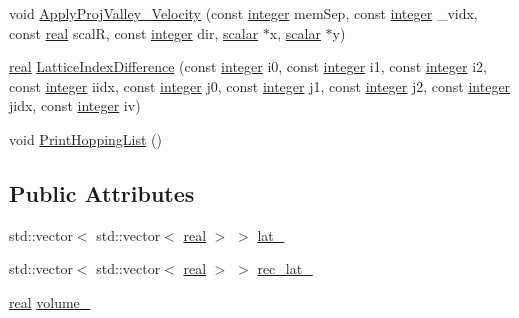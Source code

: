 \begin{DoxyCompactItemize}
void \hyperlink{classNumCal_1_1Lattice_aad6fc09875728b3dab9784b550e1cd53}{Apply\+Proj\+Valley\+\_\+\+Velocity} (const \hyperlink{namespaceNumCal_ae1031b42812e871d8f5bd9b7b15fc7d8}{integer} mem\+Sep, const \hyperlink{namespaceNumCal_ae1031b42812e871d8f5bd9b7b15fc7d8}{integer} \+\_\+vidx, const \hyperlink{namespaceNumCal_ac10564761316cff6fb75fe8bfccd6def}{real} scal\+R, const \hyperlink{namespaceNumCal_ae1031b42812e871d8f5bd9b7b15fc7d8}{integer} dir, \hyperlink{namespaceNumCal_a45f8f32ea0c2b926caa1ad763bd77c96}{scalar} $\ast$x, \hyperlink{namespaceNumCal_a45f8f32ea0c2b926caa1ad763bd77c96}{scalar} $\ast$y)
\item 
\hyperlink{namespaceNumCal_ac10564761316cff6fb75fe8bfccd6def}{real} \hyperlink{classNumCal_1_1Lattice_a02548b1f44c555055434abadfbc8ae24}{Lattice\+Index\+Difference} (const \hyperlink{namespaceNumCal_ae1031b42812e871d8f5bd9b7b15fc7d8}{integer} i0, const \hyperlink{namespaceNumCal_ae1031b42812e871d8f5bd9b7b15fc7d8}{integer} i1, const \hyperlink{namespaceNumCal_ae1031b42812e871d8f5bd9b7b15fc7d8}{integer} i2, const \hyperlink{namespaceNumCal_ae1031b42812e871d8f5bd9b7b15fc7d8}{integer} iidx, const \hyperlink{namespaceNumCal_ae1031b42812e871d8f5bd9b7b15fc7d8}{integer} j0, const \hyperlink{namespaceNumCal_ae1031b42812e871d8f5bd9b7b15fc7d8}{integer} j1, const \hyperlink{namespaceNumCal_ae1031b42812e871d8f5bd9b7b15fc7d8}{integer} j2, const \hyperlink{namespaceNumCal_ae1031b42812e871d8f5bd9b7b15fc7d8}{integer} jidx, const \hyperlink{namespaceNumCal_ae1031b42812e871d8f5bd9b7b15fc7d8}{integer} iv)
\item 
void \hyperlink{classNumCal_1_1Lattice_a37ce0f5bd308163d2fb1d4f905c039e0}{Print\+Hopping\+List} ()
\end{DoxyCompactItemize}
\subsection*{Public Attributes}
\begin{DoxyCompactItemize}
\item 
std\+::vector$<$ std\+::vector$<$ \hyperlink{namespaceNumCal_ac10564761316cff6fb75fe8bfccd6def}{real} $>$ $>$ \hyperlink{classNumCal_1_1Lattice_a9582cb6c2426ac63351a3e22a75f0c65}{lat\+\_\+}
\item 
std\+::vector$<$ std\+::vector$<$ \hyperlink{namespaceNumCal_ac10564761316cff6fb75fe8bfccd6def}{real} $>$ $>$ \hyperlink{classNumCal_1_1Lattice_ade9b12a91ec5680d176e0daa9acdd4ab}{rec\+\_\+lat\+\_\+}
\item 
\hyperlink{namespaceNumCal_ac10564761316cff6fb75fe8bfccd6def}{real} \hyperlink{classNumCal_1_1Lattice_aa21f4eee7d70942ab703f78fc052ed9e}{volume\+\_\+}
\end{DoxyCompactItemize}
